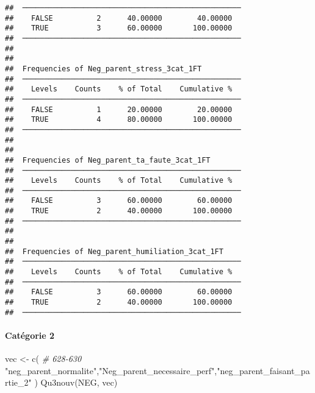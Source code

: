 \documentclass[
]{article}
\newenvironment{Shaded}{\begin{snugshade}}{\end{snugshade}}
\newcommand{\CommentTok}[1]{\textcolor[rgb]{0.56,0.35,0.01}{\textit{#1}}}
\newcommand{\FunctionTok}[1]{\textcolor[rgb]{0.00,0.00,0.00}{#1}}
\newcommand{\NormalTok}[1]{#1}
\newcommand{\OtherTok}[1]{\textcolor[rgb]{0.56,0.35,0.01}{#1}}
\newcommand{\StringTok}[1]{\textcolor[rgb]{0.31,0.60,0.02}{#1}}
\begin{document}
\begin{verbatim}
##  ────────────────────────────────────────────────── 
##    FALSE          2      40.00000        40.00000   
##    TRUE           3      60.00000       100.00000   
##  ────────────────────────────────────────────────── 
## 
## 
##  Frequencies of Neg_parent_stress_3cat_1FT          
##  ────────────────────────────────────────────────── 
##    Levels    Counts    % of Total    Cumulative %   
##  ────────────────────────────────────────────────── 
##    FALSE          1      20.00000        20.00000   
##    TRUE           4      80.00000       100.00000   
##  ────────────────────────────────────────────────── 
## 
## 
##  Frequencies of Neg_parent_ta_faute_3cat_1FT        
##  ────────────────────────────────────────────────── 
##    Levels    Counts    % of Total    Cumulative %   
##  ────────────────────────────────────────────────── 
##    FALSE          3      60.00000        60.00000   
##    TRUE           2      40.00000       100.00000   
##  ────────────────────────────────────────────────── 
## 
## 
##  Frequencies of Neg_parent_humiliation_3cat_1FT     
##  ────────────────────────────────────────────────── 
##    Levels    Counts    % of Total    Cumulative %   
##  ────────────────────────────────────────────────── 
##    FALSE          3      60.00000        60.00000   
##    TRUE           2      40.00000       100.00000   
##  ──────────────────────────────────────────────────
\end{verbatim}

\hypertarget{catuxe9gorie-2-6}{%
\paragraph{Catégorie 2}\label{catuxe9gorie-2-6}}

\begin{Shaded}
\begin{Highlighting}[]
\NormalTok{vec }\OtherTok{\textless{}{-}} \FunctionTok{c}\NormalTok{(   }\CommentTok{\# 628{-}630}
  \StringTok{"neg\_parent\_normalite"}\NormalTok{,}\StringTok{"Neg\_parent\_necessaire\_perf"}\NormalTok{,}\StringTok{"neg\_parent\_faisant\_partie\_2"}  
\NormalTok{)}
\FunctionTok{Qu3nouv}\NormalTok{(NEG, vec)}
\end{Highlighting}
\end{Shaded}
\end{document}
